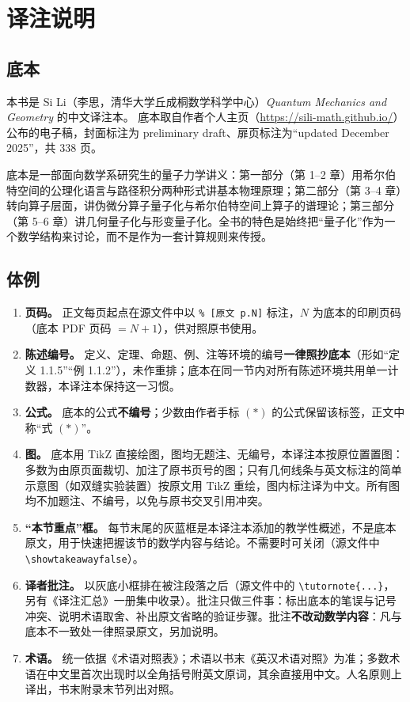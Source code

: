 \chapter*{译注说明}

\section*{底本}

本书是 Si Li（李思，清华大学丘成桐数学科学中心）\textit{Quantum Mechanics and Geometry} 的中文译注本。
底本取自作者个人主页（\url{https://sili-math.github.io/}）公布的电子稿，封面标注为 preliminary draft、扉页标注为“updated December 2025”，共 338 页。

底本是一部面向数学系研究生的量子力学讲义：第一部分（第 1–2 章）用希尔伯特空间的公理化语言与路径积分两种形式讲基本物理原理；第二部分（第 3–4 章）转向算子层面，讲伪微分算子量子化与希尔伯特空间上算子的谱理论；第三部分（第 5–6 章）讲几何量子化与形变量子化。全书的特色是始终把“量子化”作为一个数学结构来讨论，而不是作为一套计算规则来传授。

\section*{体例}

\begin{enumerate}[leftmargin=2.2em,itemsep=2pt]
\item \textbf{页码。} 正文每页起点在源文件中以 \verb|% [原文 p.N]| 标注，$N$ 为底本的印刷页码（底本 PDF 页码 $=N+1$），供对照原书使用。
\item \textbf{陈述编号。} 定义、定理、命题、例、注等环境的编号\textbf{一律照抄底本}（形如“定义 1.1.5”“例 1.1.2”），未作重排；底本在同一节内对所有陈述环境共用单一计数器，本译注本保持这一习惯。
\item \textbf{公式。} 底本的公式\textbf{不编号}；少数由作者手标 $(*)$ 的公式保留该标签，正文中称“式 $(*)$”。
\item \textbf{图。} 底本用 TikZ 直接绘图，图均无题注、无编号，本译注本按原位置置图：多数为由原页面裁切、加注了原书页号的图；只有几何线条与英文标注的简单示意图（如双缝实验装置）按原文用 TikZ 重绘，图内标注译为中文。所有图均不加题注、不编号，以免与原书交叉引用冲突。
\item \textbf{“本节重点”框。} 每节末尾的灰蓝框是本译注本添加的教学性概述，不是底本原文，用于快速把握该节的数学内容与结论。不需要时可关闭（源文件中 \verb|\showtakeawayfalse|）。
\item \textbf{译者批注。} 以灰底小框排在被注段落之后（源文件中的 \verb|\tutornote{...}|，另有《译注汇总》一册集中收录）。批注只做三件事：标出底本的笔误与记号冲突、说明术语取舍、补出原文省略的验证步骤。批注\textbf{不改动数学内容}：凡与底本不一致处一律照录原文，另加说明。
\item \textbf{术语。} 统一依据《术语对照表》；术语以书末《英汉术语对照》为准；多数术语在中文里首次出现时以全角括号附英文原词，其余直接用中文。人名原则上译出，书末附录末节列出对照。
\end{enumerate}

